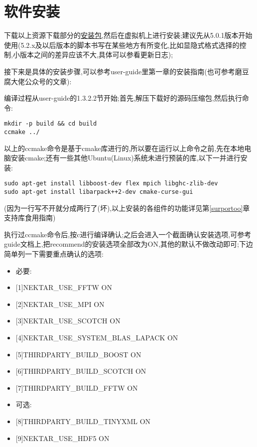 \section{软件安装}
下载以上资源下载部分的\href{https://www.nektar.info/src/}{安装包},然后在虚拟机上进行安装;建议先从5.0.1版本开始使用(5.2.x及以后版本的脚本书写在某些地方有所变化,比如显隐式格式选择的控制,小版本之间的差异应该不大,具体可以参看更新日志);
\par
接下来是具体的安装步骤,可以参考user-guide里第一章的安装指南(也可参考磨豆腐大佬公众号的文章):\par
编译过程从user-guide的1.3.2.2节开始;首先,解压下载好的源码压缩包,然后执行命令:\par
\begin{lstlisting}[frame=single]
mkdir -p build && cd build
ccmake ../
\end{lstlisting}
以上的ccmake命令是基于cmake库进行的,所以要在运行以上命令之前,先在本地电脑安装cmake;还有一些其他Ubuntu(Linux)系统未进行预装的库,以下一并进行安装:
\par
\begin{lstlisting}[frame=single]
sudo apt-get install libboost-dev flex mpich libghc-zlib-dev
sudo apt-get install libarpack++2-dev cmake-curse-gui
\end{lstlisting}
\par
(因为一行写不开就分成两行了(坏),以上安装的各组件的功能详见第\ref{surportoo}章支持库食用指南)\par
执行过ccmake命令后,按c进行编译确认;之后会进入一个截面确认安装选项,可参考guide文档上,把recommend的安装选项全部改为ON,其他的默认不做改动即可;下边简单列一下需要重点确认的选项:\par
\begin{itemize}
	\item{必要:}
	\item{[1]NEKTAR\_USE\_FFTW                  ON}
	\item{[2]NEKTAR\_USE\_MPI                   ON}
	\item{[3]NEKTAR\_USE\_SCOTCH                ON}
	\item{[4]NEKTAR\_USE\_SYSTEM\_BLAS\_LAPACK  ON}
	\item{[5]THIRDPARTY\_BUILD\_BOOST           ON}
	\item{[6]THIRDPARTY\_BUILD\_SCOTCH          ON}
	\item{[7]THIRDPARTY\_BUILD\_FFTW            ON}
	\item{可选:}
	\item{[8]THIRDPARTY\_BUILD\_TINYXML         ON}
	\item{[9]NEKTAR\_USE\_HDF5                  ON}
\end{itemize}
